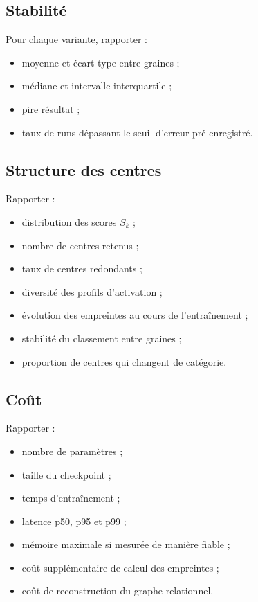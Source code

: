 \documentclass[11pt,a4paper]{article}
\begin{document}
\subsection{Stabilité}

Pour chaque variante, rapporter :
\begin{itemize}
  \item moyenne et écart-type entre graines ;
  \item médiane et intervalle interquartile ;
  \item pire résultat ;
  \item taux de runs dépassant le seuil d'erreur pré-enregistré.
\end{itemize}

\subsection{Structure des centres}

Rapporter :
\begin{itemize}
  \item distribution des scores \(S_k\) ;
  \item nombre de centres retenus ;
  \item taux de centres redondants ;
  \item diversité des profils d'activation ;
  \item évolution des empreintes au cours de l'entraînement ;
  \item stabilité du classement entre graines ;
  \item proportion de centres qui changent de catégorie.
\end{itemize}

\subsection{Coût}

Rapporter :
\begin{itemize}
  \item nombre de paramètres ;
  \item taille du checkpoint ;
  \item temps d'entraînement ;
  \item latence p50, p95 et p99 ;
  \item mémoire maximale si mesurée de manière fiable ;
  \item coût supplémentaire de calcul des empreintes ;
  \item coût de reconstruction du graphe relationnel.
\end{itemize}
\end{document}
